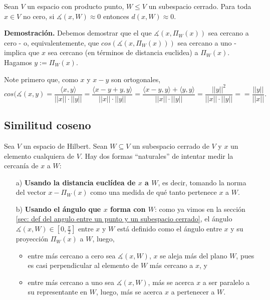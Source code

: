 \QEDB
\vspace{0.2cm}

\begin{prop}
Sean $V$ un espacio con producto punto, $W \leq V$ un subespacio
cerrado. Para toda
$x \in V$ no cero, 
si $\measuredangle(x, W) \approx 0$ entonces $d(x, W) \approx 0$.
\end{prop}
\noindent
\textbf{Demostración.}
Debemos demostrar que el que 
$\measuredangle(x, \Pi_{W}(x))$ sea cercano a cero -
o, equivalentemente, que $cos(\measuredangle(x, \Pi_{W}(x)))$
sea cercano a uno - implica que $x$ sea cercano
(en términos de distancia euclidea) a $\Pi_{W}(x)$.
Hagamos $y:= \Pi_{W}(x)$.

Note primero que, como $x$ y $x-y$ son ortogonales,
\[
cos(\measuredangle(x, y) = 
\frac{
\langle x, y \rangle 
}{||x|| \cdot ||y||} = \frac{
\langle x-y + y, y \rangle 
}{||x|| \cdot ||y||}
=
\frac{
\langle x-y, y \rangle + \langle y, y \rangle
}{||x|| \cdot ||y||}
= \frac{
||y||^{2}
}{||x|| \cdot ||y||} = 
= \frac{
||y||
}{||x||}. 
\]

\QEDB
\vspace{0.2cm}

\subsection{Similitud coseno}
\label{cosine similarity}

Sea $V$ un espacio de Hilbert.
Sean $W \subseteq V$ un subespacio cerrado de $V$ y 
$x$ un elemento cualquiera de $V$. Hay dos formas ``naturales''
de intentar medir la cercanía de $x$ a $W$:
\begin{itemize}
\item[a)] \textbf{Usando la distancia euclídea
de $x$ a $W$}, es decir, tomando la norma del vector
$x - \Pi_{W}(x)$ como una medida
de qué tanto pertenece $x$ a $W$.
\item[b)] \textbf{Usando el ángulo que $x$ forma con $W$}: como ya
vimos en la sección 
\ref{sec: def del angulo entre un punto y un subespacio cerrado}, el ángulo 
$\measuredangle (x, W) \in [0, \frac{\pi}{2}]$
entre $x$ y $W$
está definido como el ángulo entre $x$ y su proyección
$\Pi_{W}(x)$ a $W$, luego, 
	\begin{itemize}
		\item entre más cercano a cero sea $\measuredangle (x, W)$,
		$x$ se aleja más del plano $W$, pues es casi perpendicular 
		al elemento de $W$ más cercano a $x$, y
		
		\item entre más cercano a uno sea $\measuredangle (x, W)$,
		más se acerca $x$ a ser paralelo a su representante en $W$,
		luego, más se acerca $x$ a pertenecer a $W$.
	\end{itemize}
\end{itemize}

